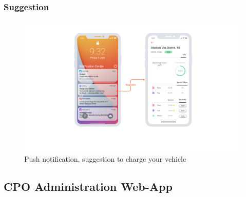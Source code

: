 \subsubsection{Suggestion}
\begin{center}
    \begin{figure}[H]
        \includegraphics[width=\textwidth]{./img/design/app/Suggestion.png}
        \caption{Push notification, suggestion to charge your vehicle}
    \end{figure}
\end{center}



\subsection{CPO Administration Web-App}